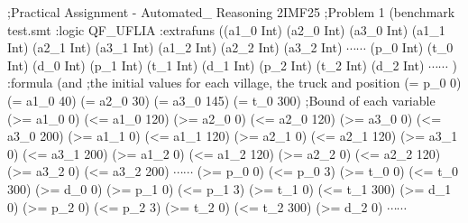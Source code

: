 \documentclass[a4paper]{article}
\begin{document}
\selectfont
{\footnotesize
\noindent
;Practical Assignment - Automated\_ Reasoning 2IMF25\newline
;Problem 1\newline
(benchmark test.smt\newline
:logic QF\_UFLIA\newline
:extrafuns \newline
((a1\_0 Int)  (a2\_0 Int)  (a3\_0 Int)\newline
 (a1\_1 Int)  (a2\_1 Int)  (a3\_1 Int)\newline
 (a1\_2 Int)  (a2\_2 Int)  (a3\_2 Int)\newline
 $\cdots \cdots$
 \newline
 (p\_0 Int)    (t\_0 Int)    (d\_0 Int) \newline
 (p\_1 Int)    (t\_1 Int)    (d\_1 Int)\newline
 (p\_2 Int)    (t\_2 Int)    (d\_2 Int)\newline
 $\cdots \cdots$
\newline
)\newline
:formula \newline
(and\newline
 ;the initial values for each village, the truck and position\newline
 (= p\_0 0)\newline
 (= a1\_0 40) \newline
 (= a2\_0 30) \newline
 (= a3\_0 145)\newline
 (= t\_0 300) \newline
 ;Bound of each variable\newline
 (>= a1\_0 0)  (<= a1\_0 120)  (>= a2\_0 0)  (<= a2\_0 120)  (>= a3\_0 0)  (<= a3\_0 200)\newline
 (>= a1\_1 0)  (<= a1\_1 120)  (>= a2\_1 0)  (<= a2\_1 120)  (>= a3\_1 0)  (<= a3\_1 200)\newline
 (>= a1\_2 0)  (<= a1\_2 120)  (>= a2\_2 0)  (<= a2\_2 120)  (>= a3\_2 0)  (<= a3\_2 200)\newline
 $\cdots \cdots$
\newline
 (>= p\_0 0)  (<= p\_0 3)   (>= t\_0 0)  (<= t\_0 300)   (>= d\_0 0) \newline
 (>= p\_1 0)  (<= p\_1 3)   (>= t\_1 0)  (<= t\_1 300)   (>= d\_1 0) \newline
 (>= p\_2 0)  (<= p\_2 3)   (>= t\_2 0)  (<= t\_2 300)   (>= d\_2 0) \newline
 $\cdots \cdots$
\newline
}
\end{document}
